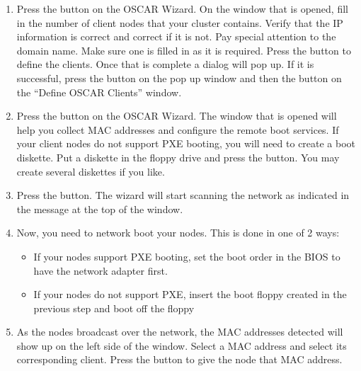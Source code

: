 \begin {enumerate}
  
\item Press the  button on the OSCAR
  Wizard.  On the window that is opened, fill in the number of client
  nodes that your cluster contains. Verify that the IP information is
  correct and correct if it is not.  Pay special attention to the
  domain name. Make sure one is filled in as it is required.  Press
  the  button to define the clients. Once that is
  complete a dialog will pop up.  If it is successful, press the
   button on the pop up window and then the
   button on the ``Define OSCAR Clients'' window.


\item Press the  button on the OSCAR Wizard.
  The window that is opened will help you collect MAC addresses and
  configure the remote boot services. If your client nodes do not
  support PXE booting, you will need to create a boot diskette. Put a
  diskette in the floppy drive and press the  button. You may create several diskettes if you like.


\item Press the  button. The wizard will
  start scanning the network as indicated in the message at the top of
  the window.


\item Now, you need to network boot your nodes. This is done in one of
  2 ways:

  \begin{itemize}
  \item If your nodes support PXE booting, set the boot order in the
    BIOS to have the network adapter first.
  \item If your nodes do not support PXE, insert the boot floppy
    created in the previous step and boot off the floppy
  \end{itemize}
        

\item As the nodes broadcast over the network, the MAC addresses
  detected will show up on the left side of the window. Select a MAC
  address and select its corresponding client. Press the
   button to give the node that MAC
  address.


\end{enumerate}
